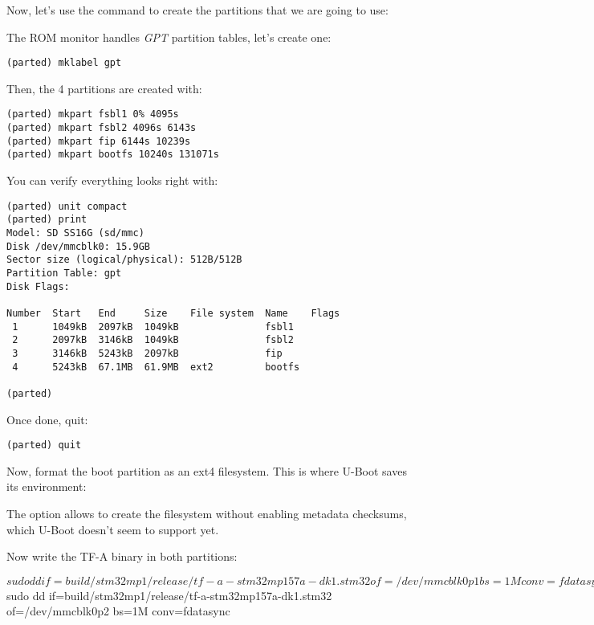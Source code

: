 
Now, let's use the  command to create the partitions that
we are going to use:


The ROM monitor handles {\em GPT} partition tables, let's create one:

\begin{verbatim}
(parted) mklabel gpt
\end{verbatim}

Then, the 4 partitions are created with:
\begin{verbatim}
(parted) mkpart fsbl1 0% 4095s
(parted) mkpart fsbl2 4096s 6143s
(parted) mkpart fip 6144s 10239s
(parted) mkpart bootfs 10240s 131071s
\end{verbatim}

You can verify everything looks right with:

\begin{verbatim}
(parted) unit compact
(parted) print
Model: SD SS16G (sd/mmc)
Disk /dev/mmcblk0: 15.9GB
Sector size (logical/physical): 512B/512B
Partition Table: gpt
Disk Flags:

Number  Start   End     Size    File system  Name    Flags
 1      1049kB  2097kB  1049kB               fsbl1
 2      2097kB  3146kB  1049kB               fsbl2
 3      3146kB  5243kB  2097kB               fip
 4      5243kB  67.1MB  61.9MB  ext2         bootfs

(parted)
\end{verbatim}

Once done, quit:
\begin{verbatim}
(parted) quit
\end{verbatim}

Now, format the boot partition as an ext4 filesystem. This is where
U-Boot saves its environment:

The  option allows to create the filesystem
without enabling metadata checksums, which U-Boot doesn't seem to
support yet.

Now write the TF-A binary in both  partitions:

\begin{bashinput}
$ sudo dd if=build/stm32mp1/release/tf-a-stm32mp157a-dk1.stm32 of=/dev/mmcblk0p1 bs=1M conv=fdatasync
$ sudo dd if=build/stm32mp1/release/tf-a-stm32mp157a-dk1.stm32 of=/dev/mmcblk0p2 bs=1M conv=fdatasync
\end{bashinput}

